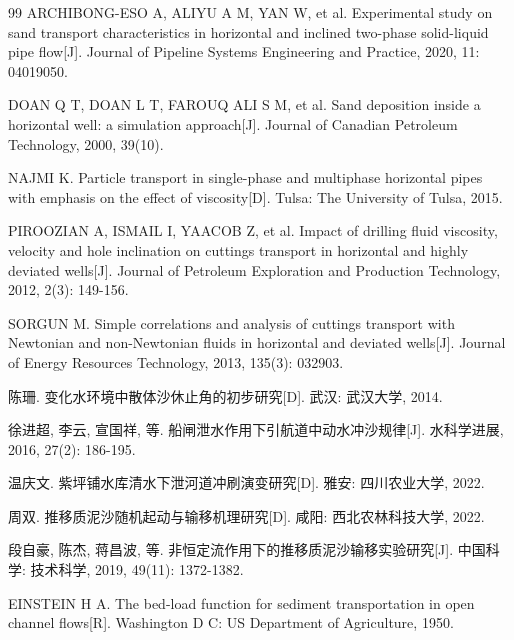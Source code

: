 \begin{thebibliography}{99}
ARCHIBONG-ESO A, ALIYU A M, YAN W, et al. Experimental study on sand transport characteristics in horizontal and inclined two-phase solid-liquid pipe flow[J]. Journal of Pipeline Systems Engineering and Practice, 2020, 11: 04019050.

DOAN Q T, DOAN L T, FAROUQ ALI S M, et al. Sand deposition inside a horizontal well: a simulation approach[J]. Journal of Canadian Petroleum Technology, 2000, 39(10).

NAJMI K. Particle transport in single-phase and multiphase horizontal pipes with emphasis on the effect of viscosity[D]. Tulsa: The University of Tulsa, 2015.

PIROOZIAN A, ISMAIL I, YAACOB Z, et al. Impact of drilling fluid viscosity, velocity and hole inclination on cuttings transport in horizontal and highly deviated wells[J]. Journal of Petroleum Exploration and Production Technology, 2012, 2(3): 149-156.

SORGUN M. Simple correlations and analysis of cuttings transport with Newtonian and non-Newtonian fluids in horizontal and deviated wells[J]. Journal of Energy Resources Technology, 2013, 135(3): 032903.

陈珊. 变化水环境中散体沙休止角的初步研究[D]. 武汉: 武汉大学, 2014.

徐进超, 李云, 宣国祥, 等. 船闸泄水作用下引航道中动水冲沙规律[J]. 水科学进展, 2016, 27(2): 186-195.

温庆文. 紫坪铺水库清水下泄河道冲刷演变研究[D]. 雅安: 四川农业大学, 2022.

周双. 推移质泥沙随机起动与输移机理研究[D]. 咸阳: 西北农林科技大学, 2022.

段自豪, 陈杰, 蒋昌波, 等. 非恒定流作用下的推移质泥沙输移实验研究[J]. 中国科学: 技术科学, 2019, 49(11): 1372-1382.

EINSTEIN H A. The bed-load function for sediment transportation in open channel flows[R]. Washington D C: US Department of Agriculture, 1950.


\end{thebibliography}
